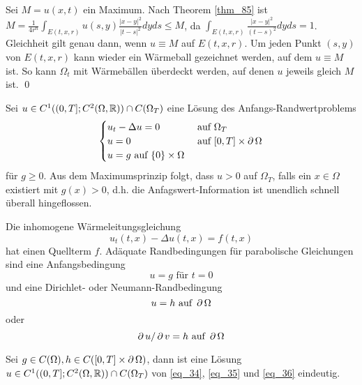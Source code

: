 	Sei $M = u(x,t)$  ein Maximum. Nach Theorem \ref{thm_85} ist $M = \frac{1}{4r^n} \int_{E(t,x,r)} u(s,y) \frac{|x-y|^2}{|t-s|^2} dyds \leq M$, da \linebreak $\int_{E(t,x,r)} \frac{|x-y|^2}{(t-s)^2} dyds = 1$. Gleichheit gilt genau dann, wenn $u \equiv M$ auf $E(t,x,r)$. Um jeden Punkt $(s,y)$ von $E(t,x,r)$ kann wieder ein Wärmeball gezeichnet werden, auf dem $u \equiv M$ ist. So kann $\Omega_t$ mit Wärmebällen überdeckt werden, auf denen $u$ jeweils gleich $M$ ist. \qed

\begin{bem} \label{bem_87}
	Sei $u \in C^1((0,T];C^2(\Omega,\mathbb{R})) \cap C(\Omega_T)$ eine Lösung des Anfangs-Randwertproblems \marginnote{[87]}
	\[ \begin{cases}
		u_t - \Delta u = 0 & \text{ auf } \Omega_T \\
		u = 0 & \text{ auf } [0,T] \times \operatorname{\partial} \Omega \\
		u = g \text{ auf } \{0\} \times \Omega \end{cases} \]
	für $g \geq 0$. Aus dem Maximumsprinzip folgt, dass $u > 0$ auf $\Omega_T$, falls ein $x \in \Omega$ existiert mit $g(x) > 0$, d.h. die Anfagswert-Information ist unendlich schnell überall hingeflossen.
\end{bem}
	
\begin{defn}
	Die inhomogene Wärmeleitungsgleichung
	\begin{equation}
		u_t(t,x) - \Delta u(t,x) = f(t,x) \label{eq_34}
	\end{equation}
	hat einen Quellterm $f$. Adäquate Randbedingungen für parabolische Gleichungen sind eine Anfangsbedingung
	\begin{equation}
		u=g \text{ für } t = 0 \label{eq_35}
	\end{equation}
	und eine Dirichlet- oder Neumann-Randbedingung
	\begin{equation}
		u = h \text{ auf } \operatorname{\partial} \Omega \label{eq_36}
	\end{equation}
	oder
	\begin{equation}
		\operatorname{\partial} u / \operatorname{\partial} v = h \text{ auf } \operatorname{\partial} \Omega \label{eq_37}
	\end{equation}
\end{defn}

\begin{thm}[Eindeutigkeit] \label{thm_88}
	Sei $g \in C(\Omega), h \in C([0,T] \times \operatorname{\partial} \Omega)$, \marginnote{[88]} dann ist eine Lösung $u \in C^1((0,T];C^2(\Omega,\mathbb{R})) \cap C(\Omega_T)$ von \eqref{eq_34}, \eqref{eq_35} und \eqref{eq_36} eindeutig.
\end{thm}

